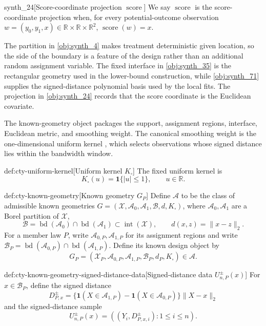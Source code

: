 \documentclass[11pt]{article}
\begin{document}
\begin{definitionv}{synth_24}[Score-coordinate projection $\operatorname{score}$]
We say $\operatorname{score}$ is the score-coordinate projection when, for every potential-outcome observation $w=(y_0,y_1,x)\in\mathbb R\times\mathbb R\times\mathbb R^2$, $\operatorname{score}(w)=x$.
\end{definitionv}

The partition in \cref{obj:synth_4} makes treatment deterministic given location, so the side of the boundary is a feature of the design rather than an additional random assignment variable. The fixed interface in \cref{obj:synth_35} is the rectangular geometry used in the lower-bound construction, while \cref{obj:synth_71} supplies the signed-distance polynomial basis used by the local fits. The projection in \cref{obj:synth_24} records that the score coordinate is the Euclidean covariate.

The known-geometry object packages the support, assignment regions, interface, Euclidean metric, and smoothing weight. The canonical smoothing weight is the one-dimensional uniform kernel , which selects observations whose signed distance lies within the bandwidth window.

\begin{definitionv}{def:cty-uniform-kernel}[Uniform kernel \(K_\square\)]
The fixed uniform kernel is
\[
K_\square(u)=\mathbf 1\{|u|\leq1\},
\qquad u\in\mathbb R.
\]
\end{definitionv}

\begin{definitionv}{def:cty-known-geometry}[Known geometry \(G_P\)]
Define \(\mathcal A\) to be the class of admissible known geometries \(G=(\mathcal X,\mathcal A_0,\mathcal A_1,\mathcal B,d,K_\square)\), where \(\mathcal A_0,\mathcal A_1\) are a Borel partition of \(\mathcal X\),
\[
\mathcal B=\operatorname{bd}(\mathcal A_0)\cap\operatorname{bd}(\mathcal A_1)\subset\operatorname{int}(\mathcal X),
\qquad d(x,z)=\lVert x-z\rVert_2.
\]
For a member law \(P\), write \(\mathcal A_{0,P},\mathcal A_{1,P}\) for its assignment regions and write \(\mathcal B_P=\operatorname{bd}(\mathcal A_{0,P})\cap\operatorname{bd}(\mathcal A_{1,P})\). Define its known design object by
\[
G_P=(\mathcal X_P,\mathcal A_{0,P},\mathcal A_{1,P},\mathcal B_P,d_P,K_\square)\in\mathcal A.
\]
\end{definitionv}

\begin{definitionv}{def:cty-known-geometry-signed-distance-data}[Signed-distance data \(U^{\pm}_{n,P}(x)\)]
For \(x\in\mathcal B_P\), define the signed distance
\[
D^{\pm}_{P,x}
=
\{\mathbf 1(X\in\mathcal A_{1,P})-\mathbf 1(X\in\mathcal A_{0,P})\}
\lVert X-x\rVert_2
\]
and the signed-distance sample
\[
U^{\pm}_{n,P}(x)=((Y_i,D^{\pm}_{P,x,i}):1\leq i\leq n).
\]
\end{definitionv}
\end{document}
